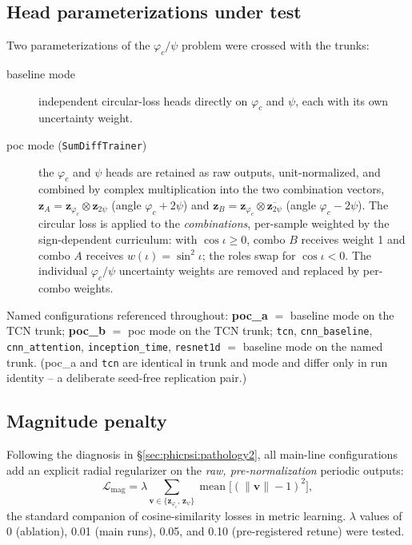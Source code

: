 \subsection{Head parameterizations under test}
\label{sec:phicpsi:modes}

Two parameterizations of the $\varphi_c/\psi$ problem were crossed with the trunks:
\begin{description}
    \item[baseline mode] independent circular-loss heads directly on $\varphi_c$ and $\psi$, each with its own uncertainty weight.
    \item[poc mode (\texttt{SumDiffTrainer})] the $\varphi_c$ and $\psi$ heads are retained as raw outputs, unit-normalized, and combined by complex multiplication into the two combination vectors, $\mathbf{z}_A = \mathbf{z}_{\varphi_c} \otimes \mathbf{z}_{2\psi}$ (angle $\varphi_c + 2\psi$) and $\mathbf{z}_B = \mathbf{z}_{\varphi_c} \otimes \overline{\mathbf{z}_{2\psi}}$ (angle $\varphi_c - 2\psi$).
    The circular loss is applied to the \emph{combinations}, per-sample weighted by the sign-dependent curriculum: with $\cos\iota \ge 0$, combo $B$ receives weight 1 and combo $A$ receives $w(\iota) = \sin^2\iota$; the roles swap for $\cos\iota < 0$.
    The individual $\varphi_c/\psi$ uncertainty weights are removed and replaced by per-combo weights.
\end{description}

Named configurations referenced throughout: \textbf{poc\_a} $=$ baseline mode on the TCN trunk; \textbf{poc\_b} $=$ poc mode on the TCN trunk; \texttt{tcn}, \texttt{cnn\_baseline}, \texttt{cnn\_attention}, \texttt{inception\_time}, \texttt{resnet1d} $=$ baseline mode on the named trunk.
(poc\_a and \texttt{tcn} are identical in trunk and mode and differ only in run identity – a deliberate seed-free replication pair.)

\subsection{Magnitude penalty}
\label{sec:phicpsi:magpen}

Following the diagnosis in \S\ref{sec:phicpsi:pathology2}, all main-line configurations add an explicit radial regularizer on the \emph{raw, pre-normalization} periodic outputs:
\begin{equation}
    \mathcal{L}_{\mathrm{mag}}
    = \lambda \sum_{\mathbf{v} \in \{\mathbf{z}_{\varphi_c},\, \mathbf{z}_{\psi}\}}
    \operatorname{mean}\!\bigl[(\lVert\mathbf{v}\rVert - 1)^2\bigr],
    \label{eq:magpen}
\end{equation}
the standard companion of cosine-similarity losses in metric learning.
$\lambda$ values of 0 (ablation), 0.01 (main runs), 0.05, and 0.10 (pre-registered retune) were tested.

